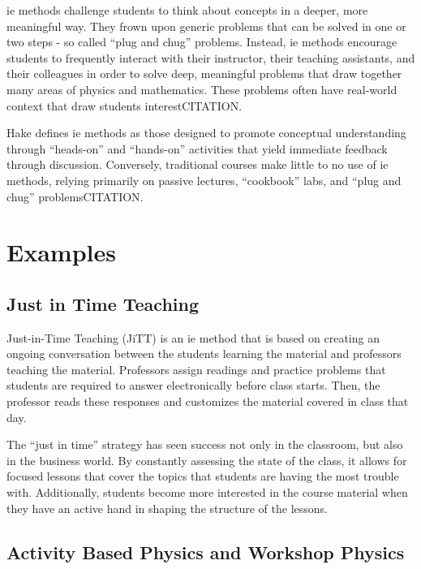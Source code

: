 \gls{ie} methods challenge students to think about concepts in a deeper, more meaningful way. They frown upon generic problems that can be solved in one or two steps - so called ``plug and chug'' problems. Instead, \gls{ie} methods encourage students to frequently interact with their instructor, their teaching assistants, and their colleagues in order to solve deep, meaningful problems that draw together many areas of physics and mathematics. These problems often have real-world context that draw students interestCITATION.

Hake defines \gls{ie} methods as those designed to promote conceptual understanding through ``heads-on'' and ``hands-on'' activities that yield immediate feedback through discussion. Conversely, traditional courses make little to no use of \gls{ie} methods, relying primarily on passive lectures, ``cookbook'' labs, and ``plug and chug'' problemsCITATION.

\section{Examples}

\subsection{Just in Time Teaching}

Just-in-Time Teaching (JiTT) is an \gls{ie} method that is based on creating an ongoing conversation between the students learning the material and professors teaching the material. Professors assign readings and practice problems that students are required to answer electronically before class starts. Then, the professor reads these responses and customizes the material covered in class that day\cite{novak1999}.

The ``just in time'' strategy has seen success not only in the classroom, but also in the business world. By constantly assessing the state of the class, it allows for focused lessons that cover the topics that students are having the most trouble with. Additionally, students become more interested in the course material when they have an active hand in shaping the structure of the lessons.

\subsection{Activity Based Physics and Workshop Physics}


